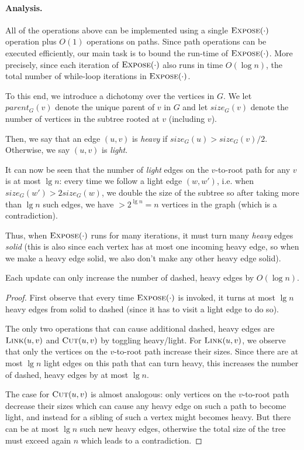\paragraph{Analysis.} All of the operations above can be implemented using a single $\textsc{Expose}(\cdot)$ operation plus $O(1)$ operations on paths. Since path operations can be executed efficiently, our main task is to bound the run-time of $\textsc{Expose}(\cdot)$. More precisely, since each iteration of $\textsc{Expose}(\cdot)$ also runs in time $O(\log n)$, the total number of while-loop iterations in $\textsc{Expose}(\cdot)$.

To this end, we introduce a dichotomy over the vertices in $G$. We let $parent_G(v)$ denote the unique parent of $v$ in $G$ and let $size_G(v)$ denote the number of vertices in the subtree rooted at $v$ (including $v$). 

\begin{definition}
Then, we say that an edge $(u,v)$ is \emph{heavy} if $size_G(u) > size_G(v)/2$. Otherwise, we say $(u,v)$ is \emph{light}. 
\end{definition}

It can now be seen that the number of \emph{light} edges on the $v$-to-root path for any $v$ is at most $\lg n$: every time we follow a light edge $(w,w')$, i.e. when $size_G(w') > 2 size_G(w)$, we double the size of the subtree so after taking more than $\lg n$ such edges, we have $> 2^{\lg n} = n$ vertices in the graph (which is a contradiction).

Thus, when $\textsc{Expose}(\cdot)$ runs for many iterations, it must turn many \emph{heavy} edges \emph{solid} (this is also since each vertex has at most one incoming heavy edge, so when we make a heavy edge solid, we also don't make any other heavy edge solid). 

\begin{claim}
Each update can only increase the number of dashed, heavy edges by $O(\log n)$. 
\end{claim}
\begin{proof}
First observe that every time $\textsc{Expose}(\cdot)$ is invoked, it turns at most $\lg n$ heavy edges from solid to dashed (since it has to visit a light edge to do so).

The only two operations that can cause additional dashed, heavy edges are $\textsc{Link}(u,v)$ and $\textsc{Cut}(u,v)$ by toggling heavy/light. For $\textsc{Link}(u,v)$, we observe that only the vertices on the $v$-to-root path increase their sizes. Since there are at most $\lg n$ light edges on this path that can turn heavy, this increases the number of dashed, heavy edges by at most $\lg n$. 

The case for $\textsc{Cut}(u,v)$ is almost analogous: only vertices on the $v$-to-root path decrease their sizes which can cause any heavy edge on such a path to become light, and instead for a sibling of such a vertex might becomes heavy. But there can be at most $\lg n$ such new heavy edges, otherwise the total size of the tree must exceed again $n$ which leads to a contradiction.
\end{proof}

